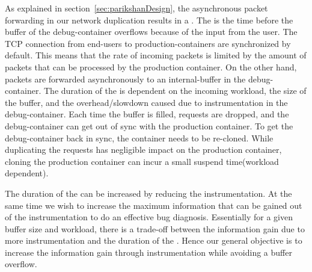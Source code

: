 As explained in section~\ref{sec:parikshanDesign}, the asynchronous packet forwarding in our network duplication results in a \debugwindow.
The \debugwindow is the time before the buffer of the debug-container overflows because of the input from the user.
The TCP connection from end-users to production-containers are synchronized by default.
This means that the rate of incoming packets is limited by the amount of packets that can be processed by the production container.
On the other hand, packets are forwarded asynchronously to an internal-buffer in the debug-container.
The duration of the \debugwindow is dependent on the incoming workload, the size of the buffer, and the overhead/slowdown caused due to instrumentation in the debug-container.
Each time the buffer is filled, requests are dropped, and the debug-container can get out of sync with the production container.
To get the debug-container back in sync, the container needs to be re-cloned.
While duplicating the requests has negligible impact on the production container, cloning the production container can incur a small suspend time(workload dependent).

The duration of the \debugwindow can be increased by reducing the instrumentation.
At the same time we wish to increase the maximum information that can be gained out of the instrumentation to do an effective bug diagnosis.
Essentially for a given buffer size and workload, there is a trade-off between the information gain due to more instrumentation and the duration of the \debugwindow.
Hence our general objective is to increase the information gain through instrumentation while avoiding a buffer overflow.


